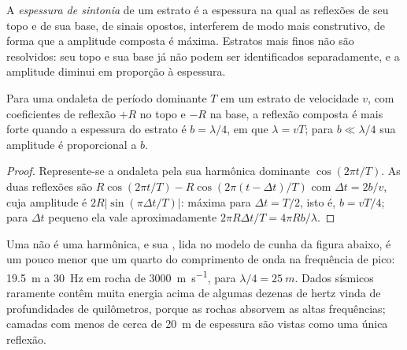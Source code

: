 \begin{definition}\label{def:b3:exploration-seismology:resolution}
A \emph{espessura de sintonia} de um estrato é a espessura
na qual as reflexões de seu topo e de sua base, de sinais opostos, interferem
de modo mais construtivo, de forma que a amplitude composta é máxima. Estratos mais finos
não são resolvidos: seu topo e sua base já não podem ser identificados separadamente, e a
amplitude diminui em proporção à espessura.
\end{definition}

\begin{proposition}\label{prop:b3:exploration-seismology:tuning}
Para uma ondaleta de período dominante $T$ em um estrato de velocidade $v$, com coeficientes de reflexão
$+R$ no topo e $-R$ na base, a reflexão composta é
mais forte quando a espessura do estrato é $b = \lambda/4$, em que $\lambda = vT$; para
$b \ll \lambda/4$ sua amplitude é proporcional a $b$.
\end{proposition}

\begin{proof}
Represente-se a ondaleta pela sua harmônica dominante $\cos(2\pi t/T)$. As duas
reflexões são $R\cos(2\pi t/T) - R\cos(2\pi(t - \Delta t)/T)$ com
$\Delta t = 2b/v$, cuja amplitude é $2R|\sin(\pi\Delta t/T)|$: máxima para
$\Delta t = T/2$, isto é, $b = vT/4$; para $\Delta t$ pequeno ela vale aproximadamente
$2\pi R\Delta t/T = 4\pi Rb/\lambda$.
\end{proof}

Uma  não é uma harmônica, e sua , lida no
modelo de cunha da figura abaixo, é um pouco menor que um quarto do comprimento de onda
na frequência de pico: \qty{19.5}{m} a \qty{30}{Hz} em rocha de
\qty{3000}{m.s^{-1}}, para $\lambda/4 = \qty{25}{m}$. Dados sísmicos raramente contêm
muita energia acima de algumas dezenas de hertz vinda de profundidades de quilômetros, porque as
rochas absorvem as altas frequências; camadas com menos de cerca de \qty{20}{m} de espessura são
vistas como uma única reflexão.

